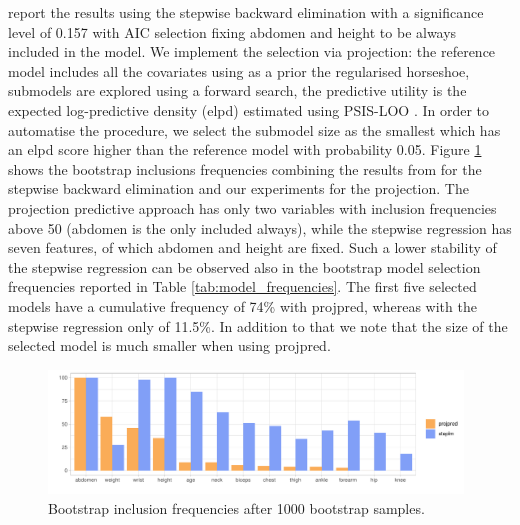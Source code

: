 \documentclass[american,]{article}
\theoremstyle{definition}
\begin{document}
\cite{paper:bodyfat} report the results using the stepwise backward elimination with a significance level of 0.157 with AIC selection fixing abdomen and height to be always included in the model. We implement the selection via projection: the reference model includes all the covariates using as a prior the regularised horseshoe, submodels are explored using a forward search, the predictive utility is the expected log-predictive density (elpd) estimated using PSIS-LOO \citep{paper:psis_loo}. In order to automatise the procedure, we select the submodel size as the smallest which has an elpd score higher than the reference model with probability 0.05. Figure \ref{fig:inclusion_frequencies} shows the bootstrap inclusions frequencies combining the results from \cite{paper:bodyfat} for the stepwise backward elimination and our experiments for the projection. The projection predictive approach has only two variables with inclusion frequencies above 50 (abdomen is the only included always), while the stepwise regression has seven features, of which abdomen and height are fixed. Such a lower stability of the stepwise regression can be observed also in the bootstrap model selection frequencies reported in Table \ref{tab:model_frequencies}. The first five selected models have a cumulative frequency of 74\% with projpred, whereas with the stepwise regression only of 11.5\%. In addition to that we note that the size of the selected model is much smaller when using projpred.

\begin{figure}[tp]
  \centering
  \includegraphics[width=0.98\textwidth]{graphics/inc_prob.pdf}
  \caption{Bootstrap inclusion frequencies after 1000 bootstrap samples.}
  \label{fig:inclusion_frequencies}
\end{figure}
\end{document}
